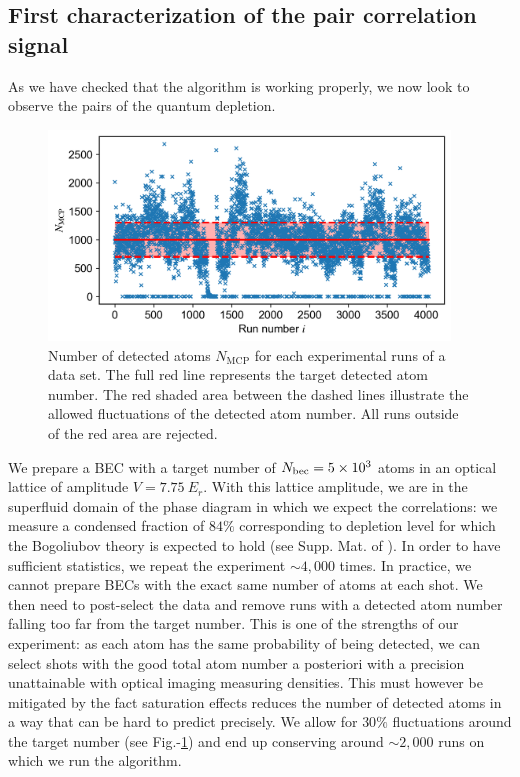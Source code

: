 \subsection{First characterization of the pair correlation signal}

\label{sec:post_selec}

As we have checked that the algorithm is working properly, we now look to observe the \kmk pairs of the quantum depletion.



\begin{figure}[]
    \centering
    \includegraphics[width=0.95\textwidth]{Fig/Chapter4/n_fluctuations.png}
    \caption[Number of detected atoms $N_{\mathrm{MCP}}$ for each experimental runs of a data set]{Number of detected atoms $N_{\mathrm{MCP}}$ for each experimental runs of a data set. The full red line represents the target detected atom number. The red shaded area between the dashed lines illustrate the allowed fluctuations of the detected atom number. All runs outside of the red area are rejected.}
    \label{fig:n_fluctuations}
\end{figure}

We prepare a BEC with a target number of $N_{\rm{bec}}=5 \times 10^3$ atoms in an optical lattice of amplitude $V=7.75 \ E_r$. With this lattice amplitude, we are in the superfluid domain of the phase diagram in which we expect the \kmk correlations: we measure a condensed fraction of $84 \%$ corresponding to depletion level for which the Bogoliubov theory is expected to hold (see Supp. Mat. of \cite{lopes2017} ). In order to have sufficient statistics, we repeat the experiment $\sim 4,000$ times. In practice, we cannot prepare BECs with the exact same number of atoms at each shot. We then need to post-select the data and remove runs with a detected atom number falling too far from the target number. This is one of the strengths of our experiment: as each atom has the same probability of being detected, we can select shots with the good total atom number a posteriori with a precision unattainable with optical imaging measuring densities. This must however be mitigated by the fact saturation effects reduces the number of detected atoms in a way that can be hard to predict precisely. We allow for $30 \%$ fluctuations around the target number (see Fig.-\ref{fig:n_fluctuations}) and end up conserving around $\sim 2,000$ runs on which we run the algorithm.

